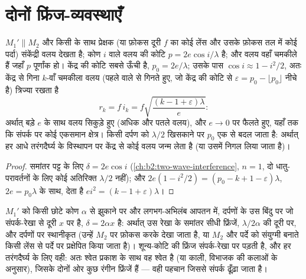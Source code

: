 \section{दोनों फ्रिंज-व्यवस्थाएँ}

\begin{proposition}[वायु-पट्ट के वलय]\label{prop:b2:michelson:rings}
$M_1' \parallel M_2$ और किसी  के साथ प्रेक्षक (या फ़ोकस दूरी $f$ का
कोई लेंस और उसके फ़ोकस तल में कोई पर्दा) संकेंद्री
वलय देखता है; कोण $i$ वाले वलय की कोटि $p = 2e\cos i/\lambda$ है; और वलय वहाँ
चमकीले हैं जहाँ $p$ पूर्णांक हो। केंद्र की कोटि सबसे ऊँची है, $p_0 =
2e/\lambda$; उसके पास $\cos i \approx 1 - i^2/2$, अतः केंद्र से गिना $k$-वाँ चमकीला वलय
(पहले वाले से गिनते हुए, जो केंद्र की कोटि से $\varepsilon = p_0 - \lfloor p_0\rfloor$
नीचे है) त्रिज्या रखता है
\[
r_k = f\,i_k = f\sqrt{\frac{(k - 1 + \varepsilon)\lambda}e} :
\]
अर्थात् बड़े $e$ के साथ वलय सिकुड़े हुए (अधिक और पतले वलय), और $e \to 0$ पर फैलते
हुए, यहाँ तक कि संपर्क पर कोई एकसमान क्षेत्र। किसी दर्पण को $\lambda/2$ खिसकाने पर
$p_0$ एक से बदल जाता है: अर्थात् हर आधे तरंगदैर्घ्य के विस्थापन पर केंद्र से कोई
वलय जन्म लेता है (या उसमें निगल लिया जाता है)।
\end{proposition}

\begin{proof}
समांतर पट्ट के लिए $\delta = 2e\cos i$ (\cref{ch:b2:two-wave-interference},
$n = 1$, दो धातु-परावर्तनों के लिए कोई अतिरिक्त $\lambda/2$ नहीं); और $2e(1 - i^2/2) =
(p_0 - k + 1 - \varepsilon)\lambda$, $2e = p_0\lambda$ के साथ, देता है $ei^2 = (k - 1 + \varepsilon)\lambda$।
\end{proof}

\begin{proposition}[वायु-पच्चर की फ्रिंजें]\label{prop:b2:michelson:wedge}
$M_1'$ को किसी छोटे कोण $\alpha$ से झुकाने पर और लगभग-अभिलंब आपतन में, दर्पणों के
उस बिंदु पर जो संपर्क-रेखा से दूरी $x$ पर है,
 $\delta = 2\alpha x$ है: अर्थात् उस रेखा के समांतर सीधी फ्रिंजें,
$\lambda/2\alpha$ की दूरी पर, और दर्पणों पर स्थानीकृत (उन्हें $M_2$ पर फ़ोकस करके
देखा जाता है, या $M_2$ और पर्दे को संयुग्मी बनाते किसी लेंस से पर्दे पर
प्रक्षेपित किया जाता है)। शून्य-कोटि की फ्रिंज संपर्क-रेखा पर पड़ती है, और हर
तरंगदैर्घ्य के लिए वही: अतः श्वेत प्रकाश के साथ वह श्वेत है (या काली, विभाजक
की कलाओं के अनुसार), जिसके दोनों ओर कुछ रंगीन फ्रिंजें हैं --- वही
पहचान जिससे संपर्क ढूँढ़ा जाता है।
\end{proposition}

